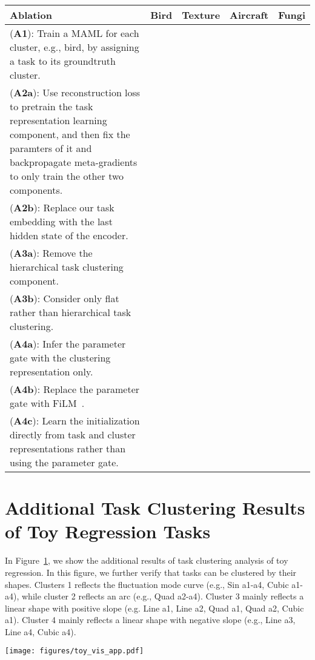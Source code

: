 \documentclass{article}
\begin{document}
\begin{table*}[!htbp]
\caption{Ablation Studies. Results of 5-way, 1-shot image classification are reported.}
\label{tab:ablationstudy}
\begin{center}
\begin{tabular}{p{150pt}|c|c|c|c}
\hline
Ablation & Bird & Texture & Aircraft & Fungi \\\hline
({\bf A1}): Train a MAML for each cluster, e.g., bird, by assigning a task to its groundtruth cluster.
&   &  &   & \\\midrule\midrule
({\bf A2a}): Use reconstruction loss to pretrain the task representation learning component, and then fix the paramters of it and backpropagate meta-gradients to only train the other two components.  &   &   &   & \\\midrule
({\bf A2b}): Replace our task embedding with the last
hidden state of the encoder. &  &   &  & \\\midrule\midrule
({\bf A3a}): Remove the hierarchical task clustering component.
&  &  &  &  \\\midrule
({\bf A3b}): Consider only flat rather than hierarchical task clustering. &  &   &  &  \\\midrule\midrule
({\bf A4a}): 
Infer the parameter gate with the clustering representation only.
&  &  &  &  \\\midrule
({\bf A4b}): Replace the parameter gate with FiLM~\cite{perez2018film}. &  &  &  &  \\\midrule
({\bf A4c}): 
Learn the initialization directly from task and cluster representations rather than using the parameter gate.
&  &  &  & \\\hline

\end{tabular}
\end{center}
\end{table*}

\newpage
\section{Additional Task Clustering Results of Toy Regression Tasks}
\label{app:restoy}
In Figure~\ref{app:restoy}, we show the additional results of task clustering analysis of toy regression. In this figure, we further verify that tasks can be clustered by their shapes. Clusters 1 reflects the fluctuation mode curve (e.g., Sin a1-a4, Cubic a1-a4), while cluster 2 reflects an arc (e.g., Quad a2-a4). Cluster 3 mainly reflects a linear shape with positive slope (e.g. Line a1, Line a2, Quad a1, Quad a2, Cubic a1). Cluster 4 mainly reflects a linear shape with negative slope (e.g., Line a3, Line a4, Cubic a4). 
\begin{figure*}[!htbp]
    \centering
    \texttt{[image: figures/toy\_vis\_app.pdf]}
    \caption{Additional results of task clustering analysis of toy regression problem.}
    \label{fig:toy_vis_app}
\end{figure*}
\end{document}
